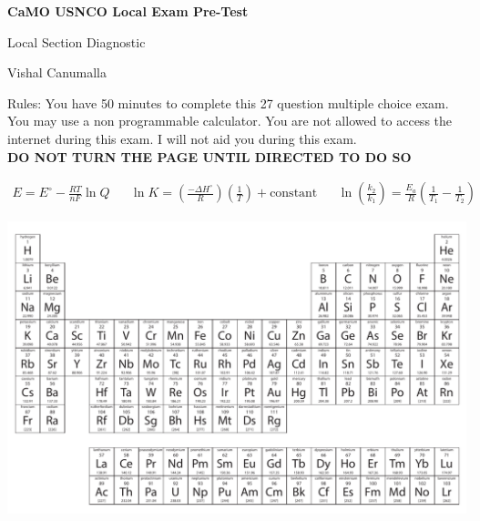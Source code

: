 \documentclass[11pt, leqno]{article}
\begin{document}
\begin{center} \LARGE \textbf{CaMO USNCO Local Exam Pre-Test} \end{center}
\begin{center}
    Local Section Diagnostic
\end{center}
\begin{center} Vishal Canumalla \end{center}

 \noindent Rules: You have 50 minutes to complete this 27 question multiple choice exam. You may use a non programmable calculator. You are not allowed to access the internet during this exam. I will not aid you during this exam. \\
 
 \centering\textbf{DO NOT TURN THE PAGE UNTIL DIRECTED TO DO SO}

\begin{center}

    \begin{align*}
        E = E^{\circ} - \frac{RT}{nF}\ln{Q} && \ln{K} = \left(\frac{-\Delta{H^{\circ}}}{R}\right)\left(\frac{1}{T}\right) + \text{constant} && \ln \left({\frac{k_2}{k_1}}\right) = \frac{E_a}{R}\left(\frac{1}{T_1} - \frac{1}{T_2}\right)
    \end{align*}


\end{center}
\hspace{-0.69 in}\includegraphics[scale = .8]{images/pertable.pdf}
\end{document}
